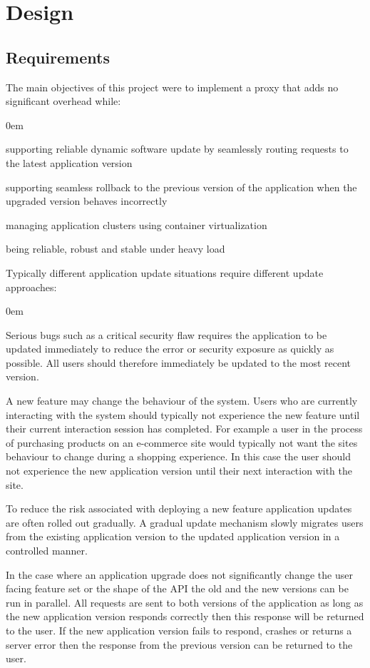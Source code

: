 \documentclass[a4paper,11pt,twoside]{report}
\begin{document}
\clearpage

\chapter{Design}\label{Design}
\section{Requirements}\label{requirements} 

The main objectives of this project were to implement a proxy that adds no significant overhead while:
\begin{list}{-}{}
\itemsep0em
\item supporting reliable dynamic software update by seamlessly routing requests to the latest application version
\item supporting seamless rollback to the previous version of the application when the upgraded version behaves incorrectly  
\item managing application clusters using container virtualization
\item being reliable, robust and stable under heavy load
\end{list}

\noindent
Typically different application update situations require different update approaches:
\begin{list}{-}{}
\itemsep0em
\item Serious bugs such as a critical security flaw requires the application to be updated immediately to reduce the error or security exposure as quickly as possible.  All users should therefore immediately be updated to the most recent version.
\item A new feature may change the behaviour of the system.  Users who are currently interacting with the system should typically not experience the new feature until their current interaction session has completed.  For example a user in the process of purchasing products on an e-commerce site would typically not want the sites behaviour to change during a shopping experience.  In this case the user should not experience the new application version until their next interaction with the site.
\item To reduce the risk associated with deploying a new feature application updates are often rolled out gradually.  A gradual update mechanism slowly migrates users from the existing application version to the updated application version in a controlled manner.
\item In the case where an application upgrade does not significantly change the user facing feature set or the shape of the API the old and the new versions can be run in parallel.  All requests are sent to both versions of the application as long as the new application version responds correctly then this response will be returned to the user.  If the new application version fails to respond, crashes or returns a server error then the response from the previous version can be returned to the user.
\end{list}
\end{document}

